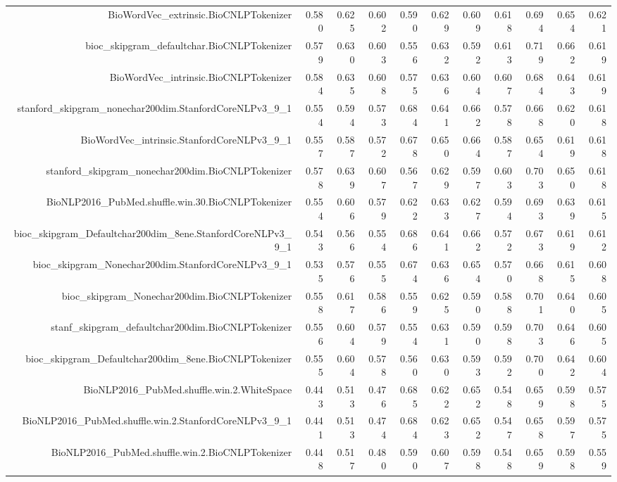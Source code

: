 \begin{table}[!h]
\begin{tabular}{rrrrrrrrrrr}
  BioWordVec\_extrinsic.BioCNLPTokenizer & 0.580 & 0.625 & 0.602 & 0.590 & 0.629 & 0.609 & 0.618 & 0.694 & 0.654 & 0.621 \\ 
  bioc\_skipgram\_defaultchar.BioCNLPTokenizer & 0.579 & 0.630 & 0.603 & 0.556 & 0.632 & 0.592 & 0.613 & 0.719 & 0.662 & 0.619 \\ 
  BioWordVec\_intrinsic.BioCNLPTokenizer & 0.584 & 0.635 & 0.608 & 0.575 & 0.636 & 0.604 & 0.607 & 0.684 & 0.643 & 0.619 \\ 
  stanford\_skipgram\_nonechar200dim.StanfordCoreNLPv3\_9\_1 & 0.554 & 0.594 & 0.573 & 0.684 & 0.641 & 0.662 & 0.578 & 0.668 & 0.620 & 0.618 \\ 
  BioWordVec\_intrinsic.StanfordCoreNLPv3\_9\_1 & 0.557 & 0.587 & 0.572 & 0.678 & 0.650 & 0.664 & 0.587 & 0.654 & 0.619 & 0.618 \\ 
  stanford\_skipgram\_nonechar200dim.BioCNLPTokenizer & 0.578 & 0.639 & 0.607 & 0.567 & 0.629 & 0.597 & 0.603 & 0.703 & 0.650 & 0.618 \\ 
  BioNLP2016\_PubMed.shuffle.win.30.BioCNLPTokenizer & 0.554 & 0.606 & 0.579 & 0.622 & 0.633 & 0.627 & 0.594 & 0.693 & 0.639 & 0.615 \\ 
  bioc\_skipgram\_Defaultchar200dim\_8ene.StanfordCoreNLPv3\_9\_1 & 0.543 & 0.566 & 0.554 & 0.686 & 0.641 & 0.662 & 0.572 & 0.673 & 0.619 & 0.612 \\ 
  bioc\_skipgram\_Nonechar200dim.StanfordCoreNLPv3\_9\_1 & 0.535 & 0.576 & 0.555 & 0.674 & 0.636 & 0.654 & 0.570 & 0.668 & 0.615 & 0.608 \\ 
  bioc\_skipgram\_Nonechar200dim.BioCNLPTokenizer & 0.558 & 0.617 & 0.586 & 0.559 & 0.625 & 0.590 & 0.588 & 0.701 & 0.640 & 0.605 \\ 
  stanf\_skipgram\_defaultchar200dim.BioCNLPTokenizer & 0.556 & 0.604 & 0.579 & 0.554 & 0.631 & 0.590 & 0.598 & 0.703 & 0.646 & 0.605 \\ 
  bioc\_skipgram\_Defaultchar200dim\_8ene.BioCNLPTokenizer & 0.555 & 0.604 & 0.578 & 0.560 & 0.630 & 0.593 & 0.592 & 0.700 & 0.642 & 0.604 \\ 
  BioNLP2016\_PubMed.shuffle.win.2.WhiteSpace & 0.443 & 0.513 & 0.476 & 0.685 & 0.622 & 0.652 & 0.548 & 0.659 & 0.598 & 0.575 \\ 
  BioNLP2016\_PubMed.shuffle.win.2.StanfordCoreNLPv3\_9\_1 & 0.441 & 0.513 & 0.474 & 0.684 & 0.623 & 0.652 & 0.547 & 0.658 & 0.597 & 0.575 \\ 
  BioNLP2016\_PubMed.shuffle.win.2.BioCNLPTokenizer & 0.448 & 0.517 & 0.480 & 0.590 & 0.607 & 0.598 & 0.548 & 0.659 & 0.598 & 0.559 \\ 
   \hline
\end{tabular}
\endgroup
\end{table}
